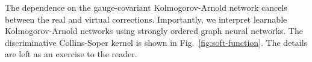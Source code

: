 The dependence on the gauge-covariant Kolmogorov-Arnold network cancels
between the real and virtual corrections. Importantly, we interpret
learnable Kolmogorov-Arnold networks using strongly ordered graph neural
networks. The discriminative Collins-Soper kernel is shown in
Fig.~\ref{fig:soft-function}. The details are left as an exercise to the
reader.

